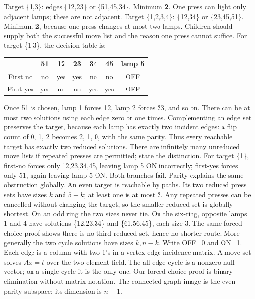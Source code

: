 \documentclass[12pt]{extarticle}
\begin{document}
\newpage
{}
Target \{1,3\}: edges \{12,23\} or \{51,45,34\}. Minimum \textbf{2}. One press can light only adjacent lamps; these are not adjacent. Target \{1,2,3,4\}: \{12,34\} or \{23,45,51\}. Minimum \textbf{2}, because one press changes at most two lamps. Children should supply both the successful move list and the reason one press cannot suffice.
For target \{1,3\}, the decision table is:
\begin{center}\renewcommand{\arraystretch}{1.4}\begin{tabular}{c|ccccc|c}&51&12&23&34&45&lamp 5\\\hline First no&no&yes&yes&no&no&OFF\\First yes&yes&no&no&yes&yes&OFF\end{tabular}\end{center}
Once 51 is chosen, lamp 1 forces 12, lamp 2 forces 23, and so on. There can be at most two solutions using each edge zero or one times. Complementing an edge set preserves the target, because each lamp has exactly two incident edges: a flip count of 0, 1, 2 becomes 2, 1, 0, with the same parity. Thus every reachable target has exactly two reduced solutions. There are infinitely many unreduced move lists if repeated presses are permitted; state the distinction.
For target \{1\}, first-no forces only 12,23,34,45, leaving lamp 5 ON incorrectly; first-yes forces only 51, again leaving lamp 5 ON. Both branches fail. Parity explains the same obstruction globally.
An even target is reachable by paths. Its two reduced press sets have sizes \(k\) and \(5-k\); at least one is at most 2. Any repeated presses can be cancelled without changing the target, so the smaller reduced set is globally shortest. On an odd ring the two sizes never tie. On the six-ring, opposite lamps 1 and 4 have solutions \{12,23,34\} and \{61,56,45\}, each size 3. The same forced-choice proof shows there is no third reduced set, hence no shorter route. More generally the two cycle solutions have sizes \(k,n-k\).
Write OFF=0 and ON=1. Each edge is a column with two 1's in a vertex-edge incidence matrix. A move set solves \(Ax=t\) over the two-element field. The all-edge cycle is a nonzero null vector; on a single cycle it is the only one. Our forced-choice proof is binary elimination without matrix notation. The connected-graph image is the even-parity subspace; its dimension is \(n-1\).
\end{document}
